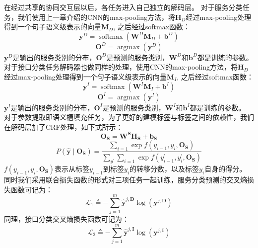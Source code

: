 在经过共享的协同交互层以后，各任务进入自己独立的解码层。
对于服务分类任务，我们使用上一章介绍的CNN的max-pooling方法，将$\mathbf{H}_{D}$经过max-pooling处理得到一个句子语义级表示的向量$\mathbf{M}_D$,
之后经过softmax函数：
\begin{equation}
  \mathbf{y}^{D}=\operatorname{softmax} (\mathbf{W}^{D}\mathbf{M}_D+\mathbf{b}^{D})
\end{equation}
\begin{equation}
  \mathbf{O}^{D}=\operatorname{argmax} (\mathbf{y}^{D})
\end{equation}
$\mathbf{y}^{D}$是输出的服务类别的分布，$\mathbf{O}^{D}$是预测的服务类别，$\mathbf{W}^{D}$和$\mathbf{b}^{D}$都是训练的参数。
对于接口分类任务解码器也做同样的处理，使用CNN的max-pooling方法，将$\mathbf{H}_{D}$经过max-pooling处理得到一个句子语义级表示的向量$\mathbf{M}_I$,
之后经过softmax函数：
\begin{equation}
  \mathbf{y}^{I}=\operatorname{softmax} (\mathbf{W}^{I}\mathbf{M}_I+\mathbf{b}^{I})
\end{equation}
\begin{equation}
  \mathbf{O}^{I}=\operatorname{argmax} (\mathbf{y}^{I})
\end{equation}
$\mathbf{y}^{I}$是输出的服务类别的分布，$\mathbf{O}^{I}$是预测的服务类别，$\mathbf{W}^{I}$和$\mathbf{b}^{I}$都是训练的参数。
对于参数提取即语义槽填充任务，为了更好的建模标签与标签之间的依赖性，我们在解码层加了CRF处理，如下式所示：
\begin{equation}
  \mathbf{O}_{\mathbf{S}} =\mathbf{W}^{\mathbf{S}} {\mathbf{H}}_{\mathbf{S}}+\mathbf{b}_{\mathbf{S}} 
\end{equation}
\begin{equation}
  P\left(\hat{\mathbf{y}} \mid \mathbf{O}_{\mathbf{S}}\right) =\frac{\sum_{i=1} \exp f\left(y_{i-1}, y_{i}, \mathbf{O}_{\mathbf{S}}\right)}{\sum_{y^{\prime}} \sum_{i=1} \exp f\left(y_{i-1}^{\prime}, y_{i}^{\prime}, \mathbf{O}_{\mathbf{S}}\right)}
  \end{equation}
  $f(y_{i-1}, y_{i}, \mathbf{O}_{\mathbf{S}})$表示从标签$y_{i-1}$到标签$y_{i}$的转移分数，以及标签$y_{i}$自身的得分。
同时我们采用联合损失函数的形式对三项任务一起训练，服务分类预测的交叉熵损失函数可记为：
\begin{equation}
\mathcal{L}_{1} \triangleq-\sum_{j=1}^{m} \hat{\mathbf{y}}^{j, \mathbf{D}} \log \left(\mathbf{y}^{j, \mathbf{D}}\right)
\end{equation}
同理，接口分类交叉熵损失函数可记为：
\begin{equation}
  \mathcal{L}_{2} \triangleq-\sum_{j=1}^{m} \hat{\mathbf{y}}^{j, \mathbf{I}} \log \left(\mathbf{y}^{j, \mathbf{I}}\right)
  \end{equation}
